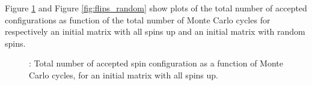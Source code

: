 \documentclass{article}
\begin{document}
{{	Figure \ref{fig:flips} and Figure \ref{fig:flips_random} show plots of the total number of accepted configurations as function of the total number of Monte Carlo cycles for respectively an initial matrix with all spins up and an initial matrix with random spins.

	\begin{figure}[H]
	\caption{: Total number of accepted spin configuration as a function of Monte Carlo cycles, for an initial matrix with all spins up. }
	\label{fig:flips}
	\end{figure}

}}
\end{document}
